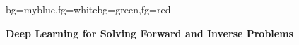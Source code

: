 {

\begin{frame}[plain]
\begin{variableblock}{}{bg=myblue,fg=white}{bg=green,fg=red}
\begin{center}
\textbf{Deep Learning for Solving Forward and Inverse Problems}
\end{center}
\end{variableblock}
\end{frame}
}
